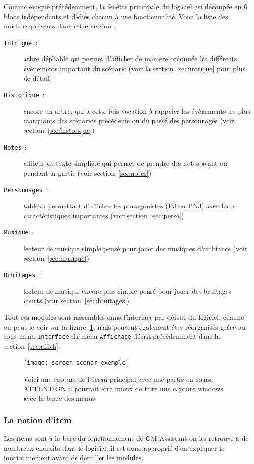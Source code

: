 \documentclass[a4paper,12pt]{article}
\newcommand*{\GMA}{GM-Assistant\xspace}
\newcommand*{\interfaceitem}[1]{\texttt{#1}}
\newcommand*{\guillemets}[1]{\og #1\fg{}\xspace}
\begin{document}
Comme évoqué précédemment, la fenêtre principale du logiciel est découpée en 6 blocs indépendants et dédiés chacun à une fonctionnalité.
Voici la liste des modules présents dans cette version~:
\begin{description}
    \item[\interfaceitem{Intrigue}~:]{arbre \guillemets{dépliable} qui permet d'afficher de manière ordonnée les différents évènements important du scénario (voir la section~\ref{sec:intrigue} pour plus de détail)}
    \item[\interfaceitem{Historique}~:]{encore un arbre, qui a cette fois vocation à rappeler les évènements les plus marquants des scénarios précédents ou du passé des personnages (voir section~\ref{sec:historique})}
    \item[\interfaceitem{Notes}~:]{éditeur de texte simpliste qui permet de prendre des notes avant ou pendant la partie (voir section~\ref{sec:notes})}
    \item[\interfaceitem{Personnages}~:]{tableau permettant d'afficher les protagonistes (PJ ou PNJ) avec leurs caractéristiques importantes (voir section~\ref{sec:perso})}
    \item[\interfaceitem{Musique}~:]{lecteur de musique simple pensé pour jouer des musiques d'ambiance (voir section~\ref{sec:musique})}
    \item[\interfaceitem{Bruitages}~:]{lecteur de musique encore plus simple pensé pour jouer des bruitages courts (voir section~\ref{sec:bruitages})}
\end{description}
Tout ces modules sont rassemblés dans l'interface par défaut du logiciel, comme on peut le voir sur la figure~\ref{fig:interface}, mais peuvent également être réorganisés grâce au sous-menu \interfaceitem{Interface} du menu \interfaceitem{Affichage} décrit précédemment dans la section~\ref{sec:affich}.
\begin{figure}[h]
    \texttt{[image: screen\_scenar\_exemple]}
    \caption{Voici une capture de l'écran principal avec une partie en cours.
    ATTENTION il pourrait être mieux de faire une capture windows avec la barre des menus}
    \label{fig:interface}
\end{figure}

\subsubsection{La notion d'item}\label{item}
Les items sont à la base du fonctionnement de \GMA on les retrouve à de nombreux endroits dans le logiciel, il est donc approprié d'en expliquer le fonctionnement avant de détailler les modules.
\end{document}
